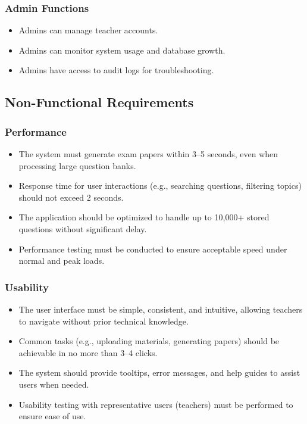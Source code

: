 \documentclass[12pt]{article}
\begin{document}
	\subsubsection{Admin Functions}
	\begin{itemize}
		\item Admins can manage teacher accounts.
		\item Admins can monitor system usage and database growth.
		\item Admins have access to audit logs for troubleshooting.
	\end{itemize}
	
	
	
	\subsection{Non-Functional Requirements}
	
	\subsubsection{Performance}
	\begin{itemize}
		\item The system must generate exam papers within 3--5 seconds, even when processing large question banks.
		\item Response time for user interactions (e.g., searching questions, filtering topics) should not exceed 2 seconds.
		\item The application should be optimized to handle up to 10,000+ stored questions without significant delay.
		\item Performance testing must be conducted to ensure acceptable speed under normal and peak loads.
	\end{itemize}
	
	\subsubsection{Usability}
	\begin{itemize}
		\item The user interface must be simple, consistent, and intuitive, allowing teachers to navigate without prior technical knowledge.
		\item Common tasks (e.g., uploading materials, generating papers) should be achievable in no more than 3--4 clicks.
		\item The system should provide tooltips, error messages, and help guides to assist users when needed.
		\item Usability testing with representative users (teachers) must be performed to ensure ease of use.
	\end{itemize}
	
\end{document}
